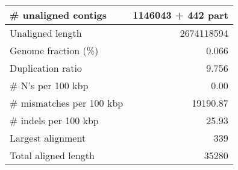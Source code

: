\documentclass[12pt,a4paper]{article}
\begin{document}
\begin{table}[ht]
\begin{center}
\begin{tabular}{|l*{1}{|r}|}
\# unaligned contigs & 1146043 + 442 part \\ \hline
Unaligned length & 2674118594 \\ \hline
Genome fraction (\%) & 0.066 \\ \hline
Duplication ratio & 9.756 \\ \hline
\# N's per 100 kbp & 0.00 \\ \hline
\# mismatches per 100 kbp & 19190.87 \\ \hline
\# indels per 100 kbp & 25.93 \\ \hline
Largest alignment & 339 \\ \hline
Total aligned length & 35280 \\ \hline
\end{tabular}
\end{center}
\end{table}
\end{document}
